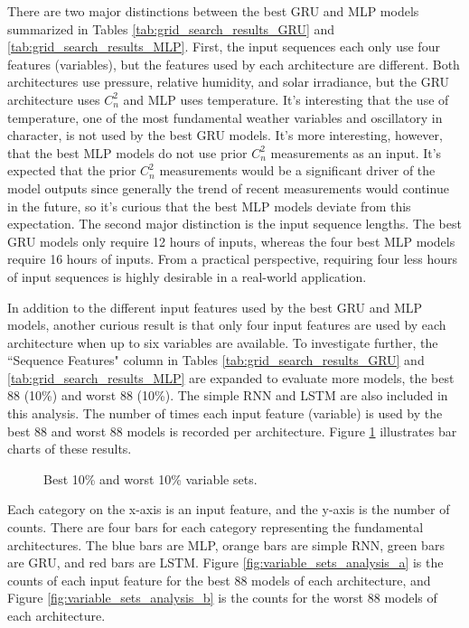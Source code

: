 There are two major distinctions between the best GRU and MLP models summarized in Tables \ref{tab:grid_search_results_GRU} and \ref{tab:grid_search_results_MLP}. First, the input sequences each only use four features (variables), but the features used by each architecture are different. Both architectures use pressure, relative humidity, and solar irradiance, but the GRU architecture uses $C_{n}^{2}$ and MLP uses temperature. It's interesting that the use of temperature, one of the most fundamental weather variables and oscillatory in character, is not used by the best GRU models. It's more interesting, however, that the best MLP models do not use prior $C_{n}^{2}$ measurements as an input. It's expected that the prior $C_{n}^{2}$ measurements would be a significant driver of the model outputs since generally the trend of recent measurements would continue in the future, so it's curious that the best MLP models deviate from this expectation. The second major distinction is the input sequence lengths. The best GRU models only require 12 hours of inputs, whereas the four best MLP models require 16 hours of inputs. From a practical perspective, requiring four less hours of input sequences is highly desirable in a real-world application.

In addition to the different input features used by the best GRU and MLP models, another curious result is that only four input features are used by each architecture when up to six variables are available. To investigate further, the ``Sequence Features" column in Tables \ref{tab:grid_search_results_GRU} and \ref{tab:grid_search_results_MLP} are expanded to evaluate more models, the best 88 (10\%) and worst 88 (10\%). The simple RNN and LSTM are also included in this analysis. The number of times each input feature (variable) is used by the best 88 and worst 88 models is recorded per architecture. Figure \ref{fig:variable_sets_analysis} illustrates bar charts of these results.
\begin{figure}[h!]
	\centering
	\hfill
	\caption{Best 10\% and worst 10\% variable sets.}
	\label{fig:variable_sets_analysis}
\end{figure}
Each category on the x-axis is an input feature, and the y-axis is the number of counts. There are four bars for each category representing the fundamental architectures. The blue bars are MLP, orange bars are simple RNN, green bars are GRU, and red bars are LSTM. Figure \ref{fig:variable_sets_analysis_a} is the counts of each input feature for the best 88 models of each architecture, and Figure \ref{fig:variable_sets_analysis_b} is the counts for the worst 88 models of each architecture.

